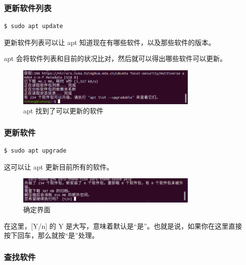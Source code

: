 \documentclass[UTF-8]{ctexart}
\begin{document}
			\subsubsection{更新软件列表}
				
				\begin{verbatim}
$ sudo apt update
				\end{verbatim}
			
				更新软件列表可以让 apt 知道现在有哪些软件，以及那些软件的版本。
				
				apt 会将软件列表和目前的状况比对，然后就可以得出哪些软件可以更新。
				
				\begin{figure}[H]
					\centering
					\includegraphics[width=0.8\textwidth]{fig/apt_update.png}
					\caption*{apt 找到了可以更新的软件}
				\end{figure}
			
			\subsubsection{更新软件}
	
				\begin{verbatim}
$ sudo apt upgrade
				\end{verbatim}
				
				这可以让 apt 更新目前所有的软件。
				
				\begin{figure}[H]
					\centering
					\includegraphics[width=0.8\textwidth]{fig/apt_upgrade_yn.png}
					\caption*{确定界面}
				\end{figure}
			
				在这里，[Y/n] 的 Y 是大写，意味着默认是“是”。也就是说，如果你在这里直接按下回车，那么就按“是”处理。
				
			\subsubsection{查找软件}
				
\end{document}
